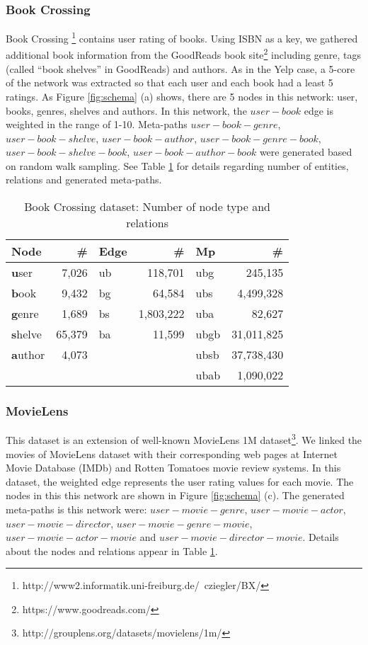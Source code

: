 \documentclass {acmart}
\begin{document}
\subsubsection*{Book Crossing}
    
Book Crossing \footnote{http://www2.informatik.uni-freiburg.de/~cziegler/BX/} contains user rating of books. Using ISBN as a key, we gathered additional book information from the GoodReads book site\footnote{https://www.goodreads.com/} including genre, tags (called ``book shelves'' in GoodReads) and authors. As in the Yelp case, a 5-core of the network was extracted so that each user and each book had a least 5 ratings. As Figure \ref{fig:schema} (a) shows, there are 5 nodes in this network: user, books, genres, shelves and authors. In this network, the $user-book$ edge is weighted in the range of 1-10. Meta-paths $user-book-genre$, $user-book-shelve$, $user-book-author$, $user-book-genre-book$, $user-book-shelve-book$, $user-book-author-book$ were generated based on random walk sampling. See Table \ref{tab:bx} for details regarding number of entities, relations and generated meta-paths. 
    
    \begin{table}[ht]
  \centering
  \caption{Book Crossing dataset: Number of node type and relations  }
  \label{tab:bx}
  \begin{tabular}{l|r||l|r ||l|r}
    Node & \# & Edge & \# & Mp & \#\\
    \hline
    \textbf{u}ser  & 7,026 & ub & 118,701 &ubg & 245,135\\
    \textbf{b}ook  & 9,432 & bg & 64,584 &ubs & 4,499,328\\
    \textbf{g}enre  & 1,689 & bs & 1,803,222 & uba& 82,627\\
    \textbf{s}helve  & 65,379 & ba & 11,599 &ubgb & 31,011,825\\
    \textbf{a}uthor  & 4,073 &  & & ubsb& 37,738,430\\
      &  &  & & ubab& 1,090,022\\
  \end{tabular}
\end{table}

\subsubsection*{MovieLens}

This dataset is an extension of well-known MovieLens 1M dataset\footnote{http://grouplens.org/datasets/movielens/1m/}. We linked the movies of MovieLens dataset with their corresponding web pages at Internet Movie Database (IMDb) and Rotten Tomatoes movie review systems. In this dataset, the weighted edge represents the user rating values for each movie. The nodes in this this network are shown in Figure \ref{fig:schema} (c). The generated meta-paths is this network were: $user-movie-genre$, $user-movie-actor$, $user-movie-director$,  $user-movie-genre-movie$, $user-movie-actor-movie$ and $user-movie-director-movie$. Details about the nodes and relations appear in Table \ref{tab:bx}.
\end{document}
